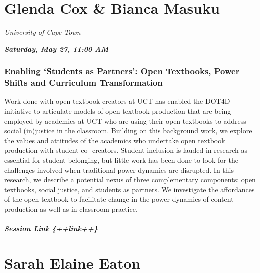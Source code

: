 \documentclass[
]{book}
\begin{document}
\hypertarget{glenda-cox-bianca-masuku}{%
\section*{Glenda Cox \& Bianca Masuku}\label{glenda-cox-bianca-masuku}}

\emph{University of Cape Town}

\textbf{\emph{Saturday, May 27, 11:00 AM}}

\begin{keynote}
\hypertarget{enabling-students-as-partners-open-textbooks-power-shifts-and-curriculum-transformation}{%
\subsubsection*{Enabling `Students as Partners': Open Textbooks, Power
Shifts and Curriculum
Transformation}\label{enabling-students-as-partners-open-textbooks-power-shifts-and-curriculum-transformation}}

Work done with open textbook creators at UCT has enabled the DOT4D
initiative to articulate models of open textbook production that are
being employed by academics at UCT who are using their open textbooks to
address social (in)justice in the classroom. Building on this background
work, we explore the values and attitudes of the academics who undertake
open textbook production with student co- creators. Student inclusion is
lauded in research as essential for student belonging, but little work
has been done to look for the challenges involved when traditional power
dynamics are disrupted. In this research, we describe a potential nexus
of three complementary components: open textbooks, social justice, and
students as partners. We investigate the affordances of the open
textbook to facilitate change in the power dynamics of content
production as well as in classroom practice.

\hypertarget{session-link-link}{%
\subparagraph{\texorpdfstring{\href{}{Session Link}
\{++link++\}}{Session Link \{++link++\}}}\label{session-link-link}}
\end{keynote}

\hypertarget{sarah-elaine-eaton}{%
\section*{Sarah Elaine Eaton}\label{sarah-elaine-eaton}}
\end{document}
